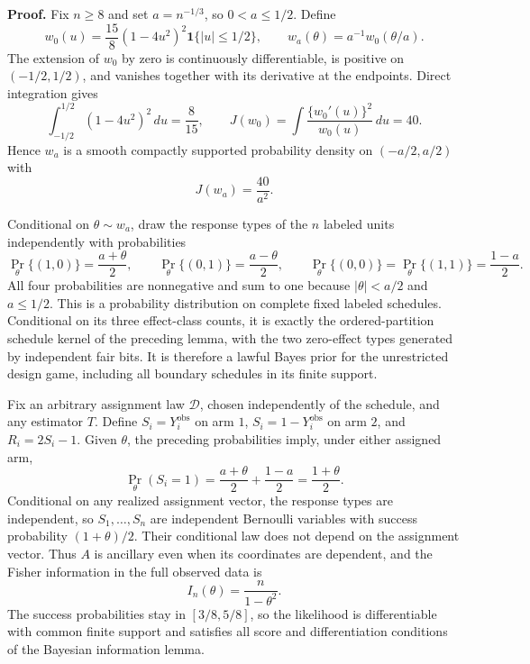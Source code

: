 \textbf{Proof.}
Fix \(n\geq8\) and set \(a=n^{-1/3}\), so \(0<a\leq1/2\). Define
\[
 w_0(u)=\frac{15}{8}(1-4u^2)^2\mathbf 1\{|u|\leq1/2\},
 \qquad
 w_a(\theta)=a^{-1}w_0(\theta/a).
\]
The extension of \(w_0\) by zero is continuously differentiable, is positive on \((-1/2,1/2)\), and vanishes together with its derivative at the endpoints. Direct integration gives
\[
 \int_{-1/2}^{1/2}(1-4u^2)^2\,du=\frac8{15},
 \qquad
 J(w_0)=\int\frac{\{w_0'(u)\}^2}{w_0(u)}\,du=40.
\]
Hence \(w_a\) is a smooth compactly supported probability density on \((-a/2,a/2)\) with
\[
 J(w_a)=\frac{40}{a^2}.
\]

Conditional on \(\theta\sim w_a\), draw the response types of the \(n\) labeled units independently with probabilities
\[
 \Pr_\theta\{(1,0)\}=\frac{a+\theta}{2},\qquad
 \Pr_\theta\{(0,1)\}=\frac{a-\theta}{2},\qquad
 \Pr_\theta\{(0,0)\}=\Pr_\theta\{(1,1)\}=\frac{1-a}{2}.
\]
All four probabilities are nonnegative and sum to one because \(|\theta|<a/2\) and \(a\leq1/2\). This is a probability distribution on complete fixed labeled schedules. Conditional on its three effect-class counts, it is exactly the ordered-partition schedule kernel of the preceding lemma, with the two zero-effect types generated by independent fair bits. It is therefore a lawful Bayes prior for the unrestricted design game, including all boundary schedules in its finite support.

Fix an arbitrary assignment law \(\mathcal D\), chosen independently of the schedule, and any estimator \(T\). Define \(S_i=Y_i^{\mathrm{obs}}\) on arm \(1\), \(S_i=1-Y_i^{\mathrm{obs}}\) on arm \(2\), and \(R_i=2S_i-1\). Given \(\theta\), the preceding probabilities imply, under either assigned arm,
\[
 \Pr_\theta(S_i=1)=\frac{a+\theta}{2}+\frac{1-a}{2}
 =\frac{1+\theta}{2}.
\]
Conditional on any realized assignment vector, the response types are independent, so \(S_1,\ldots,S_n\) are independent Bernoulli variables with success probability \((1+\theta)/2\). Their conditional law does not depend on the assignment vector. Thus \(A\) is ancillary even when its coordinates are dependent, and the Fisher information in the full observed data is
\[
 I_n(\theta)=\frac{n}{1-\theta^2}.
\]
The success probabilities stay in \([3/8,5/8]\), so the likelihood is differentiable with common finite support and satisfies all score and differentiation conditions of the Bayesian information lemma.

